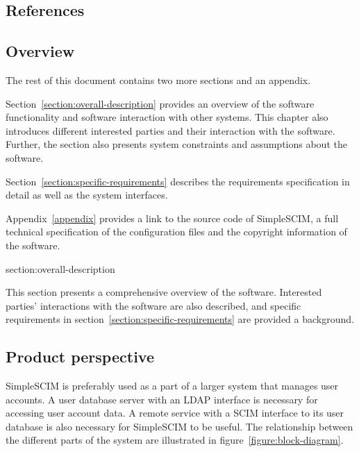 \documentclass[12pt,twoside,a4paper,titlepage]{article}
\begin{document}
  \subsection{References}

  

  \begingroup
  \renewcommand{\section}[2]{}%
  
  \endgroup

  \subsection{Overview}

  The rest of this document contains two more sections and an
  appendix.

  Section~\ref{section:overall-description} provides an overview of
  the software functionality and software interaction with other
  systems. This chapter also introduces different interested parties
  and their interaction with the software. Further, the section also
  presents system constraints and assumptions about the software.

  Section~\ref{section:specific-requirements} describes the
  requirements specification in detail as well as the system
  interfaces.

  Appendix~\ref{appendix} provides a link to the source code of
  SimpleSCIM, a full technical specification of the configuration
  files and the copyright information of the software.

  \newpage

 \section{Overall description}
 \label{section:overall-description}

 This section presents a comprehensive overview of the software.
 Interested parties' interactions with the software are also
 described, and specific requirements in
 section~\ref{section:specific-requirements} are provided a
 background.

  \subsection{Product perspective}

  SimpleSCIM is preferably used as a part of a larger system that
  manages user accounts. A user database server with an LDAP
  interface is necessary for accessing user account data. A remote
  service with a SCIM interface to its user database is also
  necessary for SimpleSCIM to be useful. The relationship between the
  different parts of the system are illustrated in
  figure~\ref{figure:block-diagram}.
\end{document}
